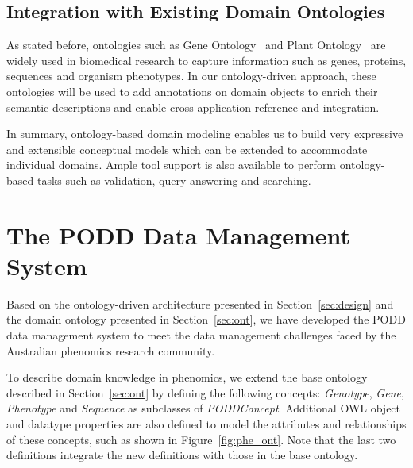 \documentclass{elsarticle}
\begin{document}
\subsection{Integration with Existing Domain Ontologies}
As stated before, ontologies such as Gene
Ontology~\cite{citeulike:212874} and Plant
Ontology~\cite{citeulike:3008167} are widely used in biomedical
research to capture information such as genes, proteins, sequences
and organism phenotypes. In our ontology-driven approach, these
ontologies will be used to add annotations on domain objects to
enrich their semantic descriptions and enable cross-application
reference and integration.

In summary, ontology-based domain modeling enables us to build very
expressive and extensible conceptual models which can be extended
to accommodate individual domains. Ample tool
support is also available to perform ontology-based tasks such as
validation, query answering and searching.

\section{The PODD Data Management System}\label{sec:podd}

Based on the ontology-driven architecture presented in Section~\ref{sec:design}
and the domain ontology presented in Section~\ref{sec:ont},
we have developed the PODD data management system to meet the
data management challenges faced by the Australian phenomics
research community.

To describe domain knowledge in phenomics, we extend the base
ontology described in Section~\ref{sec:ont} by defining the
following concepts: \emph{Genotype}, \emph{Gene}, \emph{Phenotype}
and \emph{Sequence} as subclasses of \emph{PODDConcept}. Additional
OWL object and datatype properties are also defined to model the
attributes and relationships of these concepts, such as shown in
Figure~\ref{fig:phe_ont}. Note that the last two definitions
integrate the new definitions with those in the base ontology.
\end{document}
